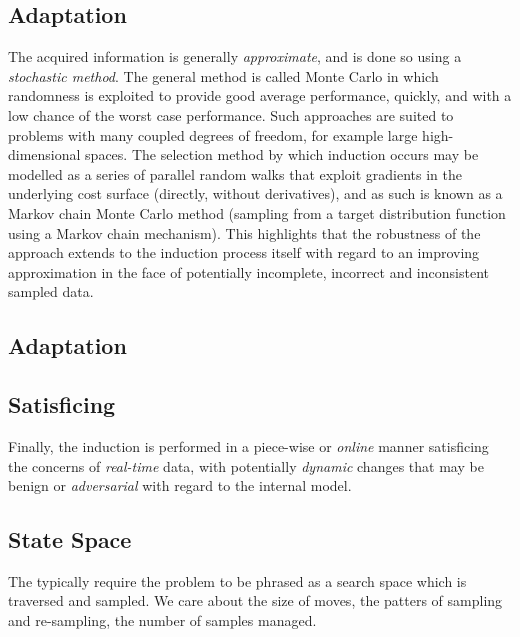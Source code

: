 \documentclass[a4paper, 11pt]{article}
\begin{document}
% 
% 
\subsection{Adaptation}
The acquired information is generally \emph{approximate}, and is done so using a \emph{stochastic method}. The general method is called Monte Carlo in which randomness is exploited to provide good average performance, quickly, and with a low chance of the worst case performance. Such approaches are suited to problems with many coupled degrees of freedom, for example large high-dimensional spaces. The selection method by which induction occurs may be modelled as a series of parallel random walks that exploit gradients in the underlying cost surface (directly, without derivatives), and as such is known as a Markov chain Monte Carlo method \cite{Andrieu2003, Clark2005} (sampling from a target distribution function using a Markov chain mechanism). This highlights that the robustness of the approach extends to the induction process itself with regard to an improving approximation in the face of potentially incomplete, incorrect and inconsistent sampled data. 



% 
% 
\subsection{Adaptation}


% 
% 
\subsection{Satisficing}

Finally, the induction is performed in a piece-wise or \emph{online} manner satisficing the concerns of \emph{real-time} data, with potentially \emph{dynamic} changes that may be benign or \emph{adversarial} with regard to the internal model.


% 
% 
\subsection{State Space}
The typically require the problem to be phrased as a search space which is traversed and sampled.
We care about the size of moves, the patters of sampling and re-sampling, the number of samples managed.






% 
% 
\end{document}
